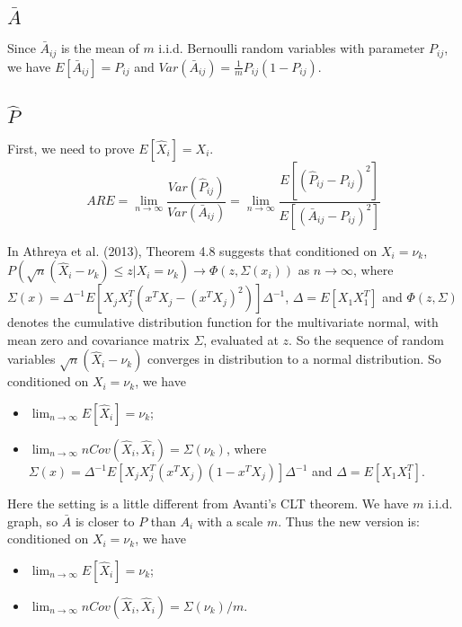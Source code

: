 \documentclass[a4paper]{article}
\begin{document}
\subsection{$\bar{A}$}

Since $\bar{A}_{ij}$ is the mean of $m$ i.i.d. Bernoulli random variables with parameter $P_{ij}$, we have $E[\bar{A}_{ij}] = P_{ij}$ and $Var(\bar{A}_{ij}) = \frac{1}{m} P_{ij} (1-P_{ij})$.



\subsection{$\hat{P}$}

First, we need to prove $E[\hat{X}_i] = X_i$.
\[
	ARE = \lim_{n \rightarrow \infty} \frac{Var(\hat{P}_{ij})}{Var(\bar{A}_{ij})}
    = \lim_{n \rightarrow \infty} \frac{E[(\hat{P}_{ij} - P_{ij})^2]}{E[(\bar{A}_{ij} - P_{ij})^2]}
\]



In Athreya et al. (2013), Theorem 4.8 suggests that conditioned on $X_i = \nu_k$, 
$P \left( \sqrt{n} (\hat{X}_i - \nu_k) \le z | X_i = \nu_k \right) \rightarrow \Phi(z, \Sigma(x_i))$ as $n \rightarrow \infty$, where $\Sigma(x) = \Delta^{-1} E[X_j X_j^T (x^T X_j - (x^T X_j)^2)] \Delta^{-1}$, $\Delta = E[X_1 X_1^T]$ and $\Phi(z, \Sigma)$ denotes the cumulative distribution function for the multivariate normal, with mean zero and covariance matrix $\Sigma$, evaluated at $z$. So the sequence of random variables $\sqrt{n} (\hat{X}_i - \nu_k)$ converges in distribution to a normal distribution.
So conditioned on $X_i = \nu_k$, we have
\begin{itemize}
\item $\lim_{n \rightarrow \infty} E[\hat{X}_i] = \nu_k$;
\item $\lim_{n \rightarrow \infty} n Cov(\hat{X}_i, \hat{X}_i) = \Sigma(\nu_k)$, where $\Sigma(x) = \Delta^{-1} E[X_j X_j^T (x^T X_j)(1 - x^T X_j)] \Delta^{-1}$ and $\Delta = E[X_1 X_1^T]$.
\end{itemize}




Here the setting is a little different from Avanti's CLT theorem. We have $m$ i.i.d. graph, so $\bar{A}$ is closer to $P$ than $A_i$ with a scale $m$. Thus the new version is: conditioned on $X_i = \nu_k$, we have
\begin{itemize}
\item $\lim_{n \rightarrow \infty} E[\hat{X}_i] = \nu_k$;
\item $\lim_{n \rightarrow \infty} n Cov(\hat{X}_i, \hat{X}_i) = \Sigma(\nu_k)/m$.
\end{itemize}
\end{document}

